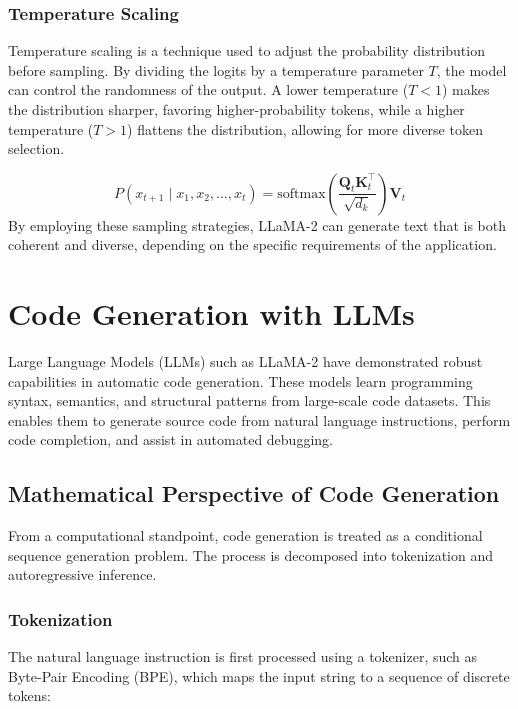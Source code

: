 \subsubsection{Temperature Scaling}
Temperature scaling is a technique used to adjust the probability distribution before sampling. By dividing the logits by a temperature parameter $T$, the model can control the randomness of the output. A lower temperature ($T < 1$) makes the distribution sharper, favoring higher-probability tokens, while a higher temperature ($T > 1$) flattens the distribution, allowing for more diverse token selection.

\begin{equation}
P(x_{t+1} \mid x_1, x_2, \dots, x_t) = \text{softmax}\left(\frac{\mathbf{Q}_t \mathbf{K}_t^\top}{\sqrt{d_k}} \right) \mathbf{V}_t
\end{equation}
By employing these sampling strategies, LLaMA-2 can generate text that is both coherent and diverse, depending on the specific requirements of the application.





\section{Code Generation with LLMs}
Large Language Models (LLMs) such as LLaMA-2 have demonstrated robust capabilities in automatic code generation. These models learn programming syntax, semantics, and structural patterns from large-scale code datasets. This enables them to generate source code from natural language instructions, perform code completion, and assist in automated debugging.

\subsection{Mathematical Perspective of Code Generation}
From a computational standpoint, code generation is treated as a conditional sequence generation problem. The process is decomposed into tokenization and autoregressive inference.

\subsubsection{Tokenization}
The natural language instruction is first processed using a tokenizer, such as Byte-Pair Encoding (BPE), which maps the input string to a sequence of discrete tokens:

